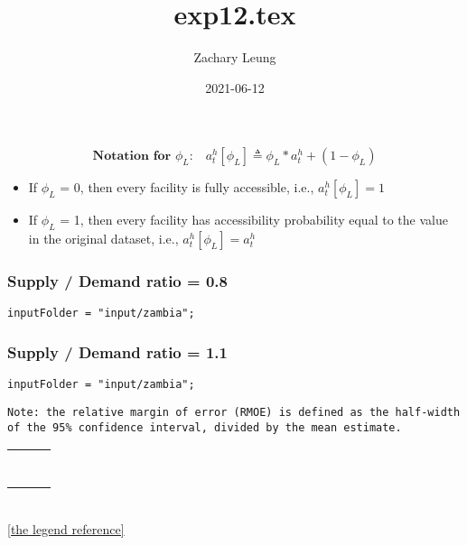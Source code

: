 \documentclass[12pt]{article}
\title{exp12.tex}
\author{Zachary Leung}
\date{2021-06-12}
\begin{document}
\maketitle

\begin{equation*}
\textbf{Notation for $\phi_L$:}
\quad
a_{t}^{h}[\phi_{L}] \triangleq \phi_{L}*a_{t}^{h} + (1-\phi_{L})
\end{equation*}

\begin{center}
\begin{itemize}
\item If $\phi_L$ = 0, then every facility is fully accessible, i.e.,
      $a_t^h[\phi_{L}] = 1$
\item If $\phi_L$ = 1, then every facility has accessibility probability
      equal to the value in the original dataset, i.e.,
      $a_t^h[\phi_{L}] = a_t^h$
\end{itemize}
\end{center}

\subsubsection*{Supply / Demand ratio = 0.8}
\begin{verbatim}
inputFolder = "input/zambia";
\end{verbatim}




\subsubsection*{Supply / Demand ratio = 1.1}
\begin{verbatim}
inputFolder = "input/zambia";
\end{verbatim}


\begin{verbatim}
Note: the relative margin of error (RMOE) is defined as the half-width
of the 95% confidence interval, divided by the mean estimate.
\end{verbatim}




\clearpage
\begin{center}
\begin{tabular}{MM}
%
&
%
\\
~&~
\\[-3mm]
%
&
%
\end{tabular}
~\\[2mm]
\ref{the legend reference}
\end{center}
\end{document}
